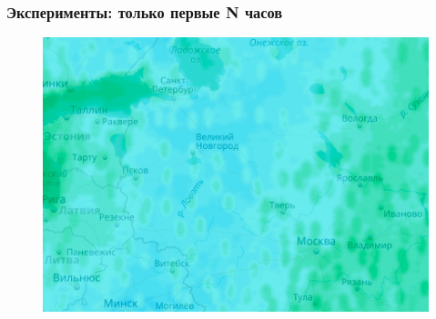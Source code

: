 \documentclass{beamer}
\begin{document}
\begin{frame}\frametitle{Эксперименты: только первые N часов}

\begin{figure}\centering
\includegraphics[width=\linewidth]{images/pic2_map.png}
\end{figure}
\end{frame}
\end{document}
